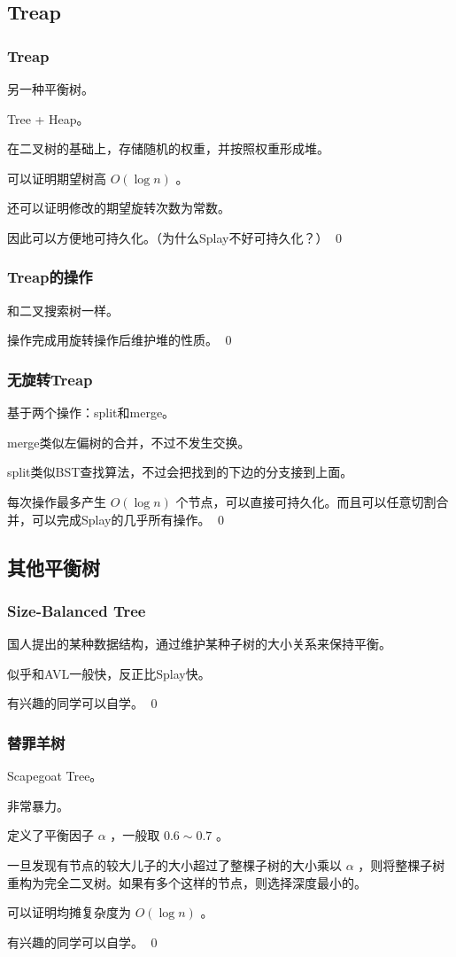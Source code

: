 \documentclass[9pt,dvipsnames,table]{beamer}
\newenvironment{qedframe}{%
	\begin{frame}[environment=qedqedframe]%
	}{%
	\qed
	\end{frame}%
}
\begin{document}
\subsection{Treap}
\begin{qedframe}
	\frametitle{Treap}
	另一种平衡树。
	
	Tree + Heap。
	
	在二叉树的基础上，存储随机的权重，并按照权重形成堆。
	
	可以证明期望树高 $ O(\log n) $ 。
	
	还可以证明修改的期望旋转次数为常数。
	
	因此可以方便地可持久化。（为什么Splay不好可持久化？）
\end{qedframe}
\begin{qedframe}
	\frametitle{Treap的操作}
	和二叉搜索树一样。
	
	操作完成用旋转操作后维护堆的性质。
\end{qedframe}
\begin{qedframe}
	\frametitle{无旋转Treap}
	基于两个操作：split和merge。
	
	merge类似左偏树的合并，不过不发生交换。
	
	split类似BST查找算法，不过会把找到的下边的分支接到上面。
	
	每次操作最多产生 $ O(\log n) $ 个节点，可以直接可持久化。而且可以任意切割合并，可以完成Splay的几乎所有操作。
\end{qedframe}

\subsection{其他平衡树}
\begin{qedframe}
	\frametitle{Size-Balanced Tree}
	国人提出的某种数据结构，通过维护某种子树的大小关系来保持平衡。
	
	似乎和AVL一般快，反正比Splay快。
	
	有兴趣的同学可以自学。
\end{qedframe}
\begin{qedframe}
	\frametitle{替罪羊树}
	Scapegoat Tree。
	
	非常暴力。
	
	定义了平衡因子 $ \alpha $ ，一般取 $ 0.6\sim 0.7 $ 。
	
	一旦发现有节点的较大儿子的大小超过了整棵子树的大小乘以 $ \alpha $ ，则将整棵子树重构为完全二叉树。如果有多个这样的节点，则选择深度最小的。
	
	可以证明均摊复杂度为 $ O(\log n) $ 。
	
	有兴趣的同学可以自学。
\end{qedframe}
\end{document}
